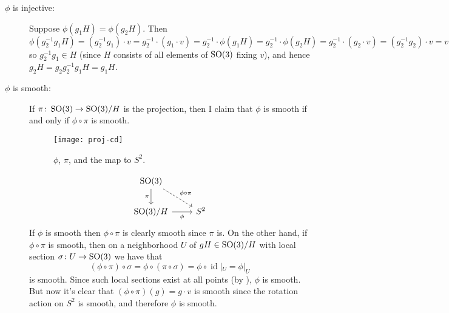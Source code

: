 \begin{example}
\begin{description}
		\item[$\phi$ is injective:] Suppose $\phi(g_1 H) = \phi(g_2 H)$. Then
		\[
			\phi(g_2^{-1} g_1 H) = (g_2^{-1} g_1) \cdot v = g_2^{-1} \cdot (g_1 \cdot v) = g_2^{-1} \cdot \phi(g_1 H) = g_2^{-1} \cdot \phi(g_2 H) = g_2^{-1} \cdot (g_2 \cdot v) = (g_2^{-1} g_2) \cdot v = v
		\]
		so $g_2^{-1} g_1 \in H$ (since $H$ consists of all elements of $\operatorname{SO}(3)$ fixing $v$), and hence $g_2 H = g_2g_2^{-1} g_1 H = g_1 H$.
		\item[$\phi$ is smooth:] If $\pi \colon\thinspace\! \operatorname{SO}(3) \to \operatorname{SO}(3)/H$ is the projection, then I claim that $\phi$ is smooth if and only if $\phi \circ \pi$ is smooth.
		\ifplastex
		\begin{figure}[htbp]
			\centering
				\texttt{[image: proj-cd]}
			\caption{$\phi$, $\pi$, and the map to $S^2$.}
			\label{fig:proj-cd}
		\end{figure}
		\else	
			\[
				\begin{tikzcd}
					\SO(3)  \arrow[d,"\pi"'] \arrow[dr,"\phi \circ \pi",dashed] \\
					\SO(3)/H \arrow[r,"\phi"'] & S^2 
				\end{tikzcd}
			\]
		\fi
		If $\phi$ is smooth then $\phi \circ \pi$ is clearly smooth since $\pi$ is. On the other hand, if $\phi \circ \pi$ is smooth, then on a neighborhood $U$ of $gH \in \operatorname{SO}(3)/H$ with local section $\sigma \colon\thinspace\! U \to \operatorname{SO}(3)$ we have that
		\[
			(\phi \circ \pi) \circ \sigma = \phi \circ (\pi \circ \sigma) = \phi \circ \operatorname{id}|_U = \phi|_U
		\]
		is smooth. Since such local sections exist at all points (by ), $\phi$ is smooth. But now it's clear that $(\phi \circ \pi)(g) = g \cdot v$ is smooth since the rotation action on $S^2$ is smooth, and therefore $\phi$ is smooth.
		

\end{description}
\end{example}
